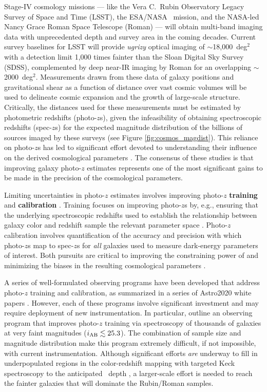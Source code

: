 \documentclass[11pt,a4paper,twoside,onecolumn,openany,final,oldfontcommands]{memoir}
\begin{document}
Stage-IV cosmology missions --- like the Vera C.~Rubin Observatory Legacy Survey of Space and Time (LSST), the ESA/NASA \euclid\ mission, and the NASA-led Nancy Grace Roman Space Telescope (Roman) --- will obtain multi-band imaging data with unprecedented depth and survey area in the coming decades.  Current survey baselines for LSST will provide \textit{ugrizy} optical imaging of $\sim$18,000~deg$^{2}$ with a detection limit 1,000 times fainter than the Sloan Digital Sky Survey (SDSS), complemented by deep near-IR imaging by Roman for an overlapping $\sim$2000~deg$^{2}$.  Measurements drawn from these data of galaxy positions and gravitational shear as a function of distance over vast cosmic volumes will be used to delineate cosmic expansion and the growth of large-scale structure. Critically, the distances used for these measurements must be estimated by photometric redshifts (photo-$z$s), given the infeasibility of obtaining spectroscopic redshifts (spec-$z$s) for the expected magnitude distribution of the billions of sources imaged by these surveys (see Figure \ref{fig:cosmos_magdist}).  This reliance on photo-$z$s has led to significant effort devoted to understanding their influence on the derived cosmological parameters \citep{huterer06, hearin10, newman15, LSSTDESCSRD}.  The consensus of these studies is that improving galaxy photo-$z$ estimates represents one of the most significant gains to be made in the precision of the cosmological parameters.

Limiting uncertainties in photo-$z$ estimates involves improving photo-$z$ \textbf{training} and \textbf{calibration} \citep{newman15}.  Training focuses on improving photo-$z$s by, e.g., ensuring that the underlying spectroscopic redshifts used to establish the relationship between galaxy color and redshift sample the relevant parameter space \citep{masters15, hemmati18}.  Photo-$z$ calibration involves quantification of the accuracy and precision with which photo-$z$s map to spec-$z$s for \textit{all} galaxies used to measure dark-energy parameters of interest.  Both pursuits are critical to improving the constraining power of and minimizing the biases in the resulting cosmological parameters \citep{LSSTDESCSRD}.

A series of well-formulated observing programs have been developed that address photo-$z$ training and calibration, as summarized in a series of Astro2020 white papers \citep{newman19, hlovek19, mandelbaum19}.  However, each of these programs involve significant investment and may require deployment of new instrumentation.  In particular, \citet{newman15, newman19} outline an observing program that improves photo-$z$ training via spectroscopy of thousands of galaxies at very faint magnitudes ($i_{\rm AB} \lesssim 25.3$).  The combination of sample size and magnitude distribution make this program extremely difficult, if not impossible, with current instrumentation.  Although significant efforts \textit{are} underway to fill in underpopulated regions in the color-redshift mapping with targeted Keck spectroscopy to the anticipated \euclid\ depth \citep{masters19}, a larger-scale effort is needed to reach the fainter galaxies that will dominate the Rubin/Roman samples.
\end{document}
